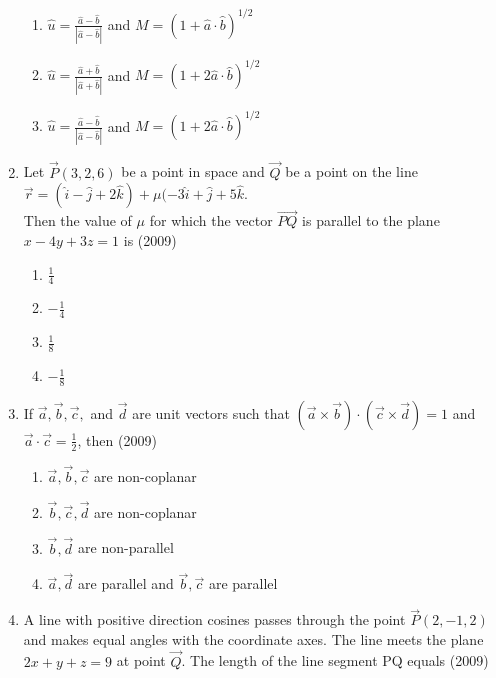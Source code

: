 \documentclass[journal,12pt,onecolumn]{IEEEtran}
\theoremstyle{remark}
\begin{document}
\begin{enumerate}
\begin{enumerate}
    \item $\hat{u} = \frac{\hat{a}-\hat{b}}{|\hat{a}-\hat{b}|}$  and $M = (1+\hat{a} \cdot \hat{b})^{1/2}$
    \item $\hat{u} = \frac{\hat{a}+\hat{b}}{|\hat{a}+\hat{b}|}$  and $M = (1+2\hat{a} \cdot \hat{b})^{1/2}$
    \item $\hat{u} = \frac{\hat{a}-\hat{b}}{|\hat{a}-\hat{b}|}$  and $M = (1+2\hat{a} \cdot \hat{b})^{1/2}$
    \end{enumerate}
    \item Let $\vec{P}(3,2,6)$ be a point in space and $\vec{Q}$ be a point on the line \\ 
    $\vec{r} = (\hat{i} - \hat{j} + 2\hat{k}) + \mu(-3\hat{i} +\hat{j}+5\hat{k}.$
    \\ Then the value of $\mu$ for which the vector $\overrightarrow{PQ}$ is parallel to the plane $x-4y+3z=1$ is
    \hfill{(2009)}
    \begin{multicols}{2}
    \begin{enumerate}
    \item $\frac{1}{4}$
    \item $-\frac{1}{4}$
    \item $\frac{1}{8}$
    \item $-\frac{1}{8}$
    \end{enumerate}
    \end{multicols}
    \item If $\vec{a}, \vec{b}, \vec{c},$ and $\vec{d}$ are unit vectors such that $(\vec{a} \times \vec{b}) \cdot (\vec{c} \times \vec{d}) = 1$ and $\vec{a} \cdot \vec{c} = \frac{1}{2}$, then
    \hfill{(2009)}
    \begin{enumerate}
    \item $\vec{a}, \vec{b}, \vec{c}$ are non-coplanar
    \item $\vec{b}, \vec{c}, \vec{d}$ are non-coplanar
    \item $\vec{b}, \vec{d}$ are non-parallel
    \item $\vec{a}, \vec{d}$ are parallel and $\vec{b}, \vec{c}$ are parallel 
    \end{enumerate}
    \item A line with positive direction cosines passes through the point $\vec{P}(2,-1,2)$ and makes equal angles with the coordinate axes. The line meets the plane $2x+y+z=9$ at point $\vec{Q}$. The length of the line segment PQ equals 
    \hfill{(2009)}
    \begin{multicols}{2}
    \begin{enumerate}

\end{enumerate}
\end{multicols}
\end{enumerate}
\end{document}
